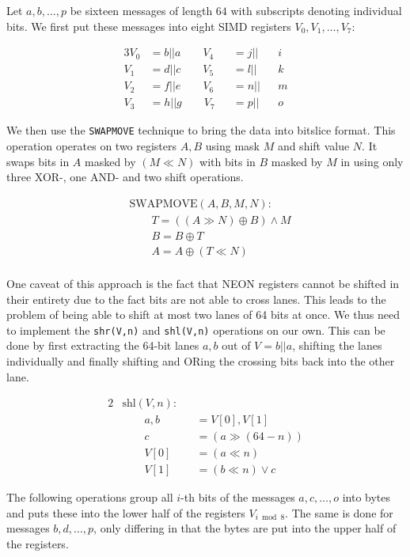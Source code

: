 Let $a,b,\dots,p$ be sixteen messages of length $64$ with subscripts denoting
individual bits. We first put these messages into eight SIMD registers
$V_0,V_1,\dots,V_7$:

\begin{alignat*}{3}
    V_0&=b||a\qquad V_4&&=j||&&i \\
    V_1&=d||c\qquad V_5&&=l||&&k \\
    V_2&=f||e\qquad V_6&&=n||&&m \\
    V_3&=h||g\qquad V_7&&=p||&&o
\end{alignat*}

We then use the \texttt{SWAPMOVE} technique to bring the data into bitslice
format. This operation operates on two registers $A,B$ using mask $M$ and shift
value $N$. It swaps bits in $A$ masked by $(M\ll N)$ with bits in $B$ masked by
$M$ in using only three XOR-, one AND- and two shift operations.

\begin{align*}
    &\text{SWAPMOVE}(A,B,M,N): \\
    &\qquad T=((A\gg N)\oplus B)\land M \\
    &\qquad B=B\oplus T \\
    &\qquad A=A\oplus (T\ll N) \\
\end{align*}

One caveat of this approach is the fact that NEON registers cannot be shifted
in their entirety due to the fact bits are not able to cross lanes. This leads
to the problem of being able to shift at most two lanes of 64 bits at once. We
thus need to implement the \texttt{shr(V,n)} and \texttt{shl(V,n)} operations
on our own. This can be done by first extracting the 64-bit lanes $a,b$ out of
$V=b||a$, shifting the lanes individually and finally shifting and ORing the
crossing bits back into the other lane.

\begin{alignat*}{2}
    &\text{shl}(V,n): \\
    &\qquad a,b&&=V[0],V[1] \\
    &\qquad c&&=(a\gg (64-n)) \\
    &\qquad V[0]&&=(a\ll n) \\
    &\qquad V[1]&&=(b\ll n)\lor c
\end{alignat*}

The following operations group all $i$-th bits of the messages $a,c,\dots,o$
into bytes and puts these into the lower half of the registers $V_{i\bmod 8}$.
The same is done for messages $b,d,\dots,p$, only differing in that the bytes
are put into the upper half of the registers.

